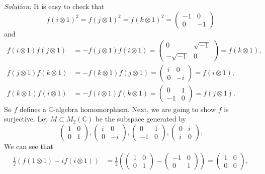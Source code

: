 \documentclass[a4paper, 12pt]{article}
\newenvironment{solution}
    {\textit{Solution:}}
    {}
\begin{document}
\begin{solution}
It is easy to check that 
\[f(i\otimes 1)^2=f(j\otimes 1)^2=f(k\otimes 1)^2=\begin{pmatrix}
	-1&0\\
	0&-1
\end{pmatrix}\]
and 
\begin{align*}
	f(i\otimes 1)f(j\otimes 1)&=-f(j\otimes 1)f(i\otimes 1)=\begin{pmatrix}
		0&\sqrt{-1}\\ 
		-\sqrt{-1}&0
	\end{pmatrix}=f(k\otimes 1),\\[5pt] 
	f(j\otimes 1)f(k\otimes 1)&=-f(k\otimes 1)f(j\otimes 1)=\begin{pmatrix}
		i&0\\ 
		0&-i
	\end{pmatrix}=f(i\otimes 1),\\[5pt] 
	f(k\otimes 1)f(i\otimes 1)&=-f(i\otimes 1)f(k\otimes 1)=\begin{pmatrix}
		0&1\\ 
		-1&0
	\end{pmatrix}=f(j\otimes 1). 
\end{align*}
So \(f\) defines a \(\mathbb{C}\)-algebra homomorphism. Next, we are going to show \(f\) is surjective. Let \(M\subset M_2(\mathbb{C})\) be the subspace generated by 
\[\begin{pmatrix}
	1&0\\ 
	0&1
\end{pmatrix},\begin{pmatrix}
	i&0\\ 
	0&-i
\end{pmatrix},\begin{pmatrix}
	0&1\\ 
	-1&0
\end{pmatrix},\begin{pmatrix}
	0&i\\ 
	i&0
\end{pmatrix}.\]
We can see that 
\begin{align*}
	\frac{1}{2}(f(1\otimes 1)-if(i\otimes 1))&=\frac{1}{2}(\begin{pmatrix}
		1&0\\ 
		0&1
	\end{pmatrix}-\begin{pmatrix}
		-1&0\\ 
		0&1
	\end{pmatrix})=\begin{pmatrix}
		1&0\\
		0&0
	\end{pmatrix},\\[5pt] 

\end{align*}
\end{solution}
\end{document}
